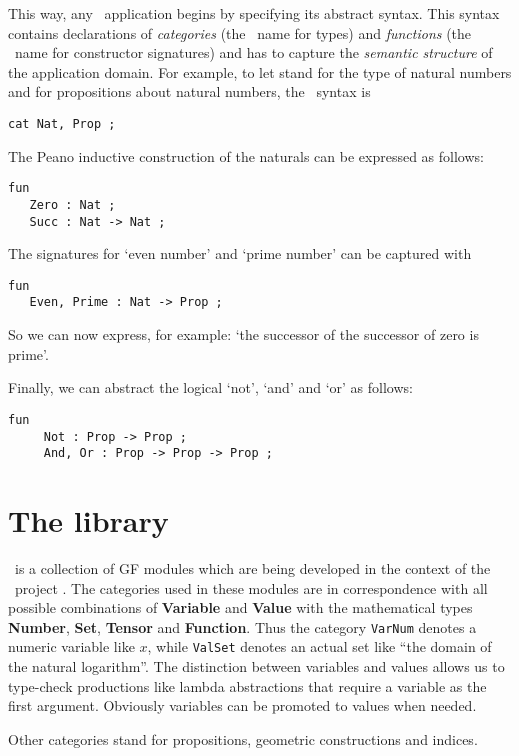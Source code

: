 \documentclass[adraft,copyright,creativecommons]{eptcs}
\begin{document}
This way, any \GF\ application begins by specifying its abstract syntax. This
syntax contains declarations of \emph{categories} (the \GF\  name for
types) and \emph{functions} (the \GF\ name for constructor signatures) and
has to capture the \emph{semantic structure} of the application domain.
For example, to let \Nat{} stand for the type of natural numbers and
\Prop{} for propositions about natural numbers, the \GF\ syntax is
\begin{lstlisting}
cat Nat, Prop ;    
\end{lstlisting}
The Peano inductive construction of the naturals can be expressed as follows:
\begin{lstlisting}
fun
   Zero : Nat ;
   Succ : Nat -> Nat ;
\end{lstlisting}
The signatures for `even number' and `prime number' can be captured with
\begin{lstlisting}
fun
   Even, Prime : Nat -> Prop ;	
\end{lstlisting}
So we can now express, for example: `the successor of the successor of zero is prime'.

Finally, we can abstract the logical `not', `and' and `or' as follows:
\begin{lstlisting}
fun
     Not : Prop -> Prop ;
     And, Or : Prop -> Prop -> Prop ;    
\end{lstlisting}



\section{The library} %
\label{sec:the_library}

\MGL\ is a collection of GF modules which are being developed in the context
of the \molto\ project \cite{molto}.
The categories used in these modules
are in correspondence with all possible combinations of \textbf{Variable}
and \textbf{Value} with the mathematical types
\textbf{Number}, \textbf{Set}, \textbf{Tensor} and \textbf{Function}.
Thus the category \texttt{VarNum} denotes a numeric
variable like $x$, while \texttt{ValSet} denotes an actual set like ``the
domain of the natural logarithm''.  The distinction between variables and
values allows us to type-check productions like lambda abstractions that
require a variable as the first argument.  Obviously variables can be
promoted to values when needed.

Other categories stand for propositions, geometric constructions and
indices.
\end{document}
